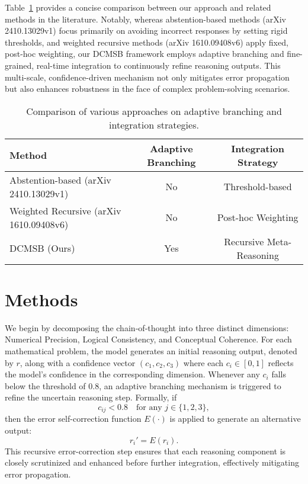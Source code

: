 \documentclass{article}
\begin{document}
Table~\ref{tab:related} provides a concise comparison between our approach and related methods in the literature. Notably, whereas abstention-based methods (arXiv 2410.13029v1) focus primarily on avoiding incorrect responses by setting rigid thresholds, and weighted recursive methods (arXiv 1610.09408v6) apply fixed, post-hoc weighting, our DCMSB framework employs adaptive branching and fine-grained, real-time integration to continuously refine reasoning outputs. This multi-scale, confidence-driven mechanism not only mitigates error propagation but also enhances robustness in the face of complex problem-solving scenarios.

\begin{table}[ht]
\centering
\begin{tabular}{lcc}
\hline
\textbf{Method} & \textbf{Adaptive Branching} & \textbf{Integration Strategy} \\
\hline
Abstention-based (arXiv 2410.13029v1) & No & Threshold-based \\[1mm]
Weighted Recursive (arXiv 1610.09408v6) & No & Post-hoc Weighting \\[1mm]
DCMSB (Ours) & Yes & Recursive Meta-Reasoning \\
\hline
\end{tabular}
\caption{Comparison of various approaches on adaptive branching and integration strategies.}
\label{tab:related}
\end{table}

\section{Methods}
We begin by decomposing the chain‐of‐thought into three distinct dimensions: Numerical Precision, Logical Consistency, and Conceptual Coherence. For each mathematical problem, the model generates an initial reasoning output, denoted by \(r\), along with a confidence vector \((c_1, c_2, c_3)\) where each \(c_i \in [0,1]\) reflects the model’s confidence in the corresponding dimension. Whenever any \(c_i\) falls below the threshold of \(0.8\), an adaptive branching mechanism is triggered to refine the uncertain reasoning step. Formally, if 
\[
c_{ij} < 0.8 \quad \text{for any } j\in\{1,2,3\},
\]
then the error self-correction function \(E(\cdot)\) is applied to generate an alternative output:
\[
r_i' = E(r_i).
\]
This recursive error-correction step ensures that each reasoning component is closely scrutinized and enhanced before further integration, effectively mitigating error propagation.
\end{document}
